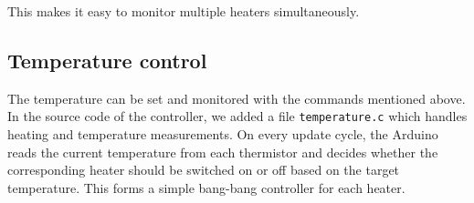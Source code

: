 This makes it easy to monitor multiple heaters simultaneously.

\subsection{Temperature control}

The temperature can be set and monitored with the commands mentioned above.
In the source code of the controller, we added a file \verb|temperature.c| which
handles heating and temperature measurements. On every update cycle, the Arduino
reads the current temperature from each thermistor and decides whether the
corresponding heater should be switched on or off based on the target temperature.
This forms a simple bang-bang controller for each heater.
